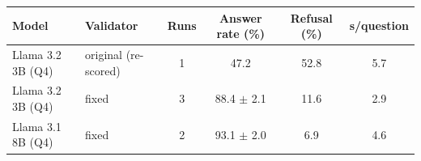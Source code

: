 \begin{tabular}{@{}llcccc@{}}
\toprule
Model & Validator & Runs & Answer rate (\%) & Refusal (\%) & s/question \\
\midrule
Llama 3.2 3B (Q4) & original (re-scored) & 1 & 47.2 & 52.8 & 5.7 \\
Llama 3.2 3B (Q4) & fixed & 3 & 88.4 $\pm$ 2.1 & 11.6 & 2.9 \\
Llama 3.1 8B (Q4) & fixed & 2 & 93.1 $\pm$ 2.0 & 6.9 & 4.6 \\
\bottomrule
\end{tabular}